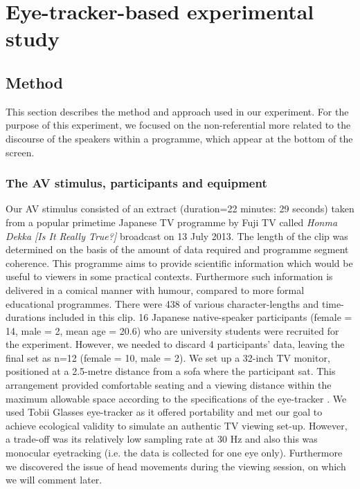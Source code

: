 \documentclass[output=paper]{langsci/langscibook}
\begin{document}
\section{Eye-tracker-based experimental study}

\subsection{Method}

This section describes the method and approach used in our experiment. For the purpose of this experiment, we focused on the non-referential  more related to the discourse of the speakers within a programme, which appear at the bottom of the screen.  

\subsubsection{The AV stimulus, participants and equipment}

Our AV stimulus consisted of an extract (duration=22 minutes: 29 seconds) taken from a popular primetime Japanese TV programme by Fuji TV called \textit{Honma Dekka [Is It Really True?]} broadcast on 13 July 2013. The length of the clip was determined on the basis of the amount of  data required and programme segment coherence.  This programme aims to provide scientific information which would be useful to viewers in some practical contexts. Furthermore such information is delivered in a comical manner with humour, compared to more formal educational programmes. There were 438  of various character-lengths and time-durations included in this clip. 16 Japanese native-speaker participants (female = 14, male = 2, mean age = 20.6) who are university students were recruited for the experiment. However, we needed to discard 4 participants' data, leaving the final set as n=12 (female = 10, male = 2). We set up a 32-inch TV monitor, positioned at a 2.5-metre distance from a sofa where the participant sat. This arrangement provided comfortable seating and a viewing distance within the maximum allowable space according to the specifications of the eye-tracker \citep{Tobii2012}. We used Tobii Glasses eye-tracker as it offered portability and met our goal to achieve ecological validity to simulate an authentic TV viewing set-up. However, a trade-off was its relatively low sampling rate at 30 Hz and also this was monocular eyetracking (i.e. the data is collected for one eye only).  Furthermore we discovered the issue of head movements during the viewing session, on which we will comment later.  
\end{document}
